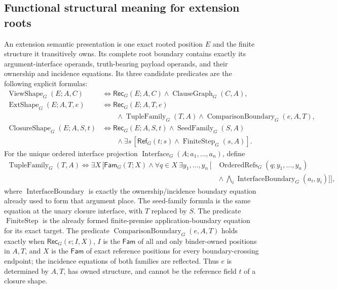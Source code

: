 \documentclass[11pt,twoside]{article}
\newcommand{\Rec}{\mathsf{Rec}}
\newcommand{\Fam}{\mathsf{Fam}}
\newcommand{\RefPos}{\mathsf{Ref}}
\begin{document}
\subsection{Functional structural meaning for extension roots}

An extension semantic presentation is one exact rooted position \(E\) and the
finite structure it transitively owns.  Its complete root boundary contains
exactly its argument-interface operands, truth-bearing payload operands, and their
ownership and incidence equations.  Its three candidate predicates are the
following explicit formulas:
\[
\begin{aligned}
 \operatorname{ViewShape}_G(E;A,C)
   &\Longleftrightarrow \Rec_G(E;A,C)
      \land\operatorname{ClauseGraph}_G(C,A),\\
 \operatorname{ExtShape}_G(E;A,T,e)
   &\Longleftrightarrow \Rec_G(E;A,T,e)\\[-0.3em]
   &\qquad{}\land\operatorname{TupleFamily}_G(T,A)
      \land\operatorname{ComparisonBoundary}_G(e,A,T),\\
 \operatorname{ClosureShape}_G(E;A,S,t)
   &\Longleftrightarrow \Rec_G(E;A,S,t)
      \land\operatorname{SeedFamily}_G(S,A)\\[-0.3em]
   &\qquad{}\land\exists s\,[\RefPos_G(t;s)
                         \land\operatorname{FiniteStep}_G(s,A)].
\end{aligned}
\]
For the unique ordered interface projection
\(\operatorname{Interface}_G(A;a_1,\ldots,a_n)\), define
\[
\begin{split}
 \operatorname{TupleFamily}_G(T,A)\Longleftrightarrow
 \exists X\,[\Fam_G(T;X)\land
 \forall q\in X\ \exists y_1,\ldots,y_n\,[{}&
 \operatorname{OrderedRefs}_G(q;y_1,\ldots,y_n)\\[-0.3em]
 &{}\land\bigwedge_i
 \operatorname{InterfaceBoundary}_G(a_i,y_i)]],
\end{split}
\]
where \(\operatorname{InterfaceBoundary}\) is exactly the ownership/incidence
boundary equation already used to form that argument place.  The seed-family
formula is the same equation at the unary closure interface, with \(T\) replaced
by \(S\).  The predicate \(\operatorname{FiniteStep}\)
is the already formed finite-premise application-boundary equation for its exact
target.  The predicate \(\operatorname{ComparisonBoundary}_G(e,A,T)\) holds exactly when
\(\Rec_G(e;I,X)\), \(I\) is the \(\Fam\) of all and only binder-owned positions
in \(A,T\), and \(X\) is the \(\Fam\) of exact reference positions for every
boundary-crossing endpoint; the incidence equations of both families are
reflected.  Thus \(e\) is determined by \(A,T\), has owned structure, and cannot
be the reference field \(t\) of a closure shape.
\end{document}
